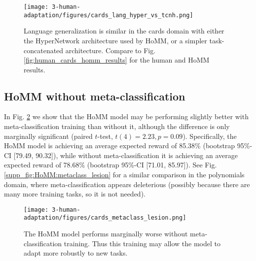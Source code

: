 \begin{figure}[H]
\centering
\texttt{[image: 3-human-adaptation/figures/cards\_lang\_hyper\_vs\_tcnh.png]}
\caption[Language generalization is similar in the cards domain with either the HyperNetwork architecture used by HoMM, or a simpler task-concatenated architecture.]{Language generalization is similar in the cards domain with either the HyperNetwork architecture used by HoMM, or a simpler task-concatenated architecture. Compare to Fig. \ref{fig:human_cards_homm_results} for the human and HoMM results.} \label{supp_fig:human:lang_tcnh}
\end{figure}



\subsection{HoMM without meta-classification}

In Fig. \ref{supp_fig:human:homm_metaclass_lesion} we show that the HoMM model may be performing slightly better with meta-classification training than without it, although the difference is only marginally significant (paired \(t\)-test, \(t(4) = 2.23, p = 0.09\)). Specifically, the HoMM model is achieving an average expected reward of 85.38\% (bootstrap 95\%-CI [79.49, 90.32]), while without meta-classification it is achieving an average expected reward of 78.68\% (bootstrap 95\%-CI [71.01, 85.97]). See Fig. \ref{supp_fig:HoMM:metaclass_lesion} for a similar comparison in the polynomials domain, where meta-classification appears deleterious (possibly because there are many more training tasks, so it is not needed). 

\begin{figure}[H]
\centering
\texttt{[image: 3-human-adaptation/figures/cards\_metaclass\_lesion.png]}
\caption[The HoMM model performs marginally worse without meta-classification training.]{The HoMM model performs marginally worse without meta-classification training. Thus this training may allow the model to adapt more robustly to new tasks.} \label{supp_fig:human:homm_metaclass_lesion}
\end{figure}

